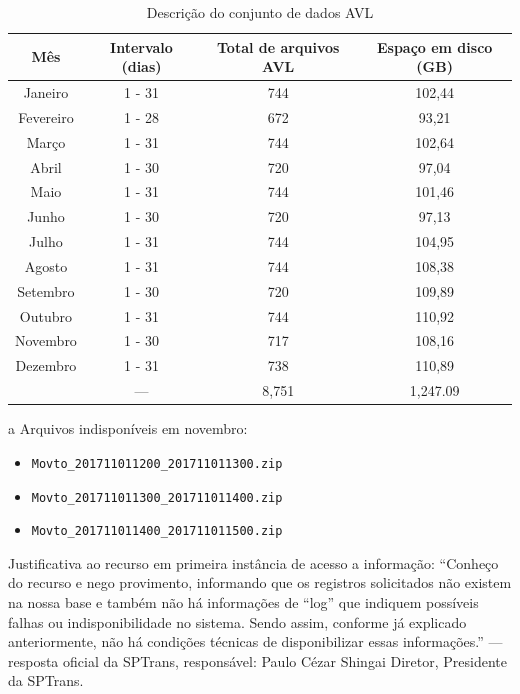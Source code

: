 \documentclass[
	12pt,				%
	oneside,			%
	a4paper,			%
	english,			%
	brazil				%
	]{abntex2ppgsi}
\begin{document}
{{\begin{table}[!htb]
\begin{threeparttable}
\centering
\caption{Descrição do conjunto de dados AVL}
\label{tab:avlDataset}
\begin{tabular}{ c | c | c | c }
\toprule
\textbf{Mês} & \textbf{Intervalo (dias)} & \textbf{Total de arquivos AVL} & \textbf{Espaço em disco (GB)} \\
\midrule
Janeiro\tnote{c} & 1 - 31 & 744 & 102,44 \\
\hline
 Fevereiro & 1 - 28 & 672 & 93,21 \\
\hline
 Março & 1 - 31 & 744 & 102,64 \\
\hline
 Abril & 1 - 30 & 720 & 97,04 \\
\hline
 Maio & 1 - 31 & 744 & 101,46 \\
\hline
 Junho & 1 - 30 & 720 & 97,13 \\
\hline
 Julho & 1 - 31 & 744 & 104,95 \\
\hline
 Agosto & 1 - 31 & 744 & 108,38 \\
\hline
 Setembro & 1 - 30 & 720 & 109,89 \\
\hline
 Outubro & 1 - 31 & 744 & 110,92 \\
\hline
 Novembro\tnote{a} & 1 - 30 & 717 & 108,16 \\
\hline
 Dezembro\tnote{b} & 1 - 31 & 738 & 110,89 \\
\midrule
{} & --- & 8,751 & 1,247.09 \\
\bottomrule
\end{tabular}
\begin{tablenotes}
\item[a]Arquivos indisponíveis em novembro: 
\begin{itemize}
\item \texttt{Movto\_201711011200\_201711011300.zip}
\item \texttt{Movto\_201711011300\_201711011400.zip}
\item \texttt{Movto\_201711011400\_201711011500.zip}
\end{itemize}
Justificativa ao recurso em primeira instância de acesso a informação: ``Conheço do recurso e nego provimento, informando que os registros solicitados não existem na nossa base e também não há informações de ``log'' que indiquem possíveis falhas ou indisponibilidade no sistema. Sendo assim, conforme já explicado anteriormente, não há condições técnicas de disponibilizar essas informações.'' --- resposta oficial da SPTrans, responsável: Paulo Cézar Shingai Diretor, Presidente da SPTrans.

\end{tablenotes}
\end{threeparttable}
\end{table}}}
\end{document}
